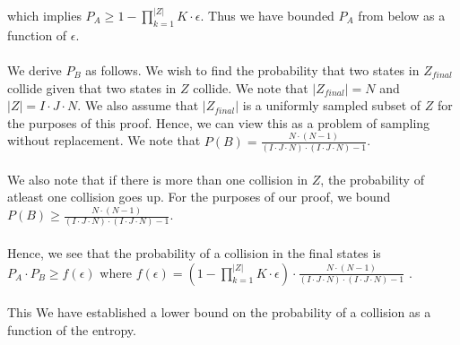 \documentclass[letterpaper,twocolumn,10pt]{article}
\begin{document}
\\
which implies $P_{A} \geq 1 - \prod_{k=1}^{|Z|} K \cdot \epsilon$. Thus we have bounded $P_{A}$ from below as a function of $\epsilon$. 
\\
\\
We derive $P_{B}$ as follows. We wish to find the probability that two states in $Z_{final}$ collide given that two states in $Z$ collide. We note that $|Z_{final}| = N$ and $|Z| = I \cdot J \cdot N$. We also assume that $|Z_{final}|$ is a uniformly sampled subset of $Z$ for the purposes of this proof. Hence, we can view this as a problem of sampling without replacement. We note that $P(B) = \frac{N \cdot (N-1)}{(I \cdot J \cdot N) \cdot (I \cdot J \cdot N) -1}$. 
\\
\\
We also note that if there is more than one collision in $Z$, the probability of atleast one collision goes up. For the purposes of our proof, we bound $P(B) \geq \frac{N \cdot (N-1)}{(I \cdot J \cdot N) \cdot (I \cdot J \cdot N) -1}$.
\\
\\
Hence, we see that the probability of a collision in the final states is $P_{A} \cdot P_{B} \geq f(\epsilon)$ where $f(\epsilon) = (1 - \prod_{k=1}^{|Z|} K \cdot \epsilon) \cdot \frac{N \cdot (N-1)}{(I \cdot J \cdot N) \cdot (I \cdot J \cdot N) -1}$ . 
\\
\\
This We have established a lower bound on the probability of a collision as a function of the entropy.
\end{document}
